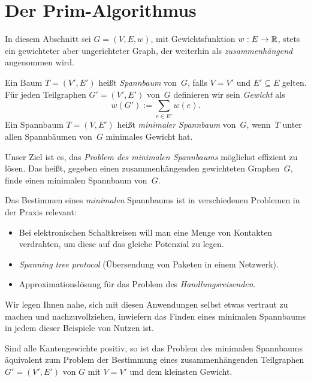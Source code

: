 \section{Der Prim-Algorithmus}

\begin{bem}
In diesem Abschnitt sei $G=(V,E,w)$, mit Gewichtsfunktion $w : E \to \mathbb{R}$, stets ein gewichteter aber ungerichteter Graph, der weiterhin als \emph{zusammenhängend} angenommen wird.
\end{bem}

\begin{defn}
Ein Baum $T=(V',E')$ heißt \emph{Spannbaum} von~$G$, falls $V=V'$ und $E' \subseteq E$ gelten.
Für jeden Teilgraphen $G' = (V', E')$ von~$G$ definieren wir sein \emph{Gewicht} als
\[
w(G') := \sum_{e \in E'} w(e).
\]
%
Ein Spannbaum $T=(V,E')$ heißt \emph{minimaler Spannbaum} von~$G$, wenn~$T$ unter allen Spannbäumen von~$G$ minimales Gewicht hat.
\end{defn} 

\begin{bem} 
Unser Ziel ist es, das \emph{Problem des minimalen Spannbaums} möglichst effizient zu lösen.
Das heißt, gegeben einen zusammenhängenden gewichteten Graphen~$G$, finde einen minimalen Spannbaum von~$G$.

Das Bestimmen eines \emph{minimalen} Spannbaums ist in verschiedenen Problemen in der Praxis relevant:
%
\begin{itemize}
 \item Bei elektronischen Schaltkreisen will man eine Menge von Kontakten verdrahten, um diese auf das gleiche Potenzial zu legen.
 \item \emph{Spanning tree protocol} (Übersendung von Paketen in einem Netzwerk).
 \item Approximationslösung für das Problem des \emph{Handlungsreisenden}.
\end{itemize}
Wir legen Ihnen nahe, sich mit diesen Anwendungen selbst etwas vertraut zu machen und nachzuvollziehen, inwiefern das Finden eines minimalen Spannbaums in jedem dieser Beispiele von Nutzen ist.
\end{bem} 



\begin{bem}
Sind alle Kantengewichte positiv, so ist das Problem des minimalen Spannbaums äquivalent zum Problem der Bestimmung eines zusammenhängenden Teilgraphen $G'= (V',E')$ von $G$ mit $V=V'$ und dem kleinsten Gewicht.
\end{bem}


